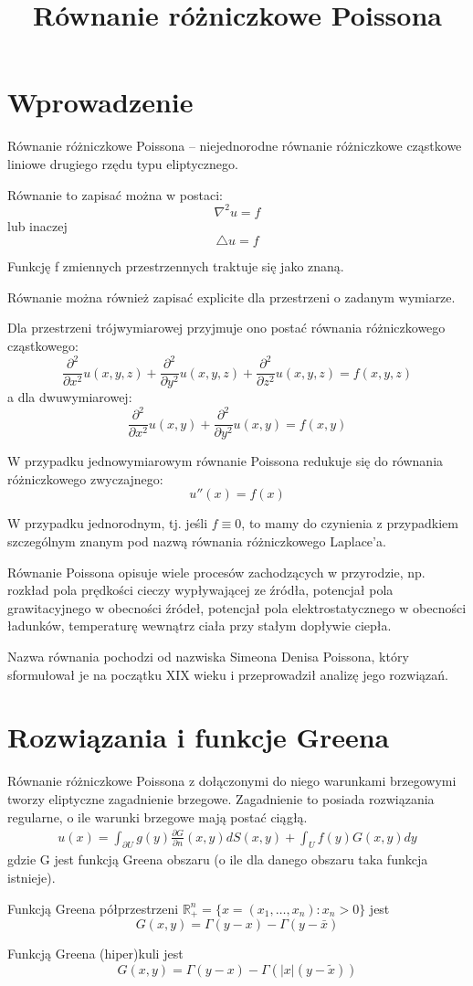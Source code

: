 \documentclass{article}
\begin{document}
\title{Równanie różniczkowe Poissona}
\maketitle

\section*{Wprowadzenie}
Równanie różniczkowe Poissona – niejednorodne równanie różniczkowe cząstkowe liniowe drugiego rzędu typu eliptycznego.

Równanie to zapisać można w postaci: 
\[ \nabla^{2}u=f \]
lub inaczej
$$ \triangle u = f $$

Funkcję f zmiennych przestrzennych traktuje się jako znaną.

Równanie można również zapisać explicite dla przestrzeni o zadanym wymiarze.

Dla przestrzeni trójwymiarowej przyjmuje ono postać równania różniczkowego cząstkowego: 
\begin{displaymath}
{\frac {\partial ^{2}}{\partial x^{2}}}u(x,y,z)+{\frac {\partial ^{2}}{\partial y^{2}}}u(x,y,z)+{\frac {\partial ^{2}}{\partial z^{2}}}u(x,y,z)=f(x,y,z)
\end{displaymath}
a dla dwuwymiarowej:
\begin{equation*}
{\frac {\partial ^{2}}{\partial x^{2}}}u(x,y)+{\frac {\partial ^{2}}{\partial y^{2}}}u(x,y)=f(x,y)
\end{equation*}

W przypadku jednowymiarowym równanie Poissona redukuje się do równania różniczkowego zwyczajnego: 
$$ u''(x)=f(x) $$

W przypadku jednorodnym, tj. jeśli $ f\equiv 0 $, to mamy do czynienia z przypadkiem szczególnym znanym pod nazwą równania różniczkowego Laplace’a. 

Równanie Poissona opisuje wiele procesów zachodzących w przyrodzie, np. rozkład pola prędkości cieczy wypływającej ze źródła, potencjał pola grawitacyjnego w obecności źródeł, potencjał pola elektrostatycznego w obecności ładunków, temperaturę wewnątrz ciała przy stałym dopływie ciepła.

Nazwa równania pochodzi od nazwiska Simeona Denisa Poissona, który sformułował je na początku XIX wieku i przeprowadził analizę jego rozwiązań. 

\section*{Rozwiązania i funkcje Greena}
Równanie różniczkowe Poissona z dołączonymi do niego warunkami brzegowymi tworzy eliptyczne zagadnienie brzegowe. Zagadnienie to posiada rozwiązania regularne, o ile warunki brzegowe mają postać ciągłą. 
\begin{gather*}
u(x)=\int _{\partial U}g(y){\frac {\partial G}{\partial n}}(x,y)dS(x,y)+\int _{U}f(y)G(x,y)dy
\end{gather*}
gdzie G jest funkcją Greena obszaru (o ile dla danego obszaru taka funkcja istnieje). 

Funkcją Greena półprzestrzeni \begin{math} \mathbb {R} _{+}^{n}=\{x=(x_{1},\dots ,x_{n}):x_{n}>0\} \end{math} jest 
\[ G(x,y)=\Gamma (y-x)-\Gamma (y-{\bar {x}}) \]

Funkcją Greena (hiper)kuli jest
$$ G(x,y)=\Gamma (y-x)-\Gamma (|x|(y-{\tilde {x}})) $$
\end{document}
